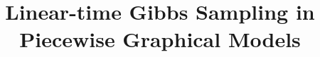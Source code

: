 \documentclass[letterpaper]{article}
\title{
Linear-time Gibbs Sampling in Piecewise Graphical Models
}
\begin{document}
\maketitle

\begin{abstract}

\end{abstract}
















\clearpage

\end{document}
